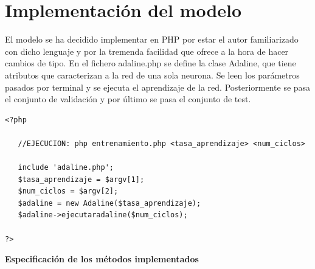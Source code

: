 \documentclass[11pt,spanish,listoffigures,listoftables]{tfgetsinf}
\begin{document}
\section{Implementación del modelo}

\par El modelo se ha decidido implementar en PHP por estar el autor familiarizado con dicho lenguaje y por la tremenda facilidad que ofrece a la hora de hacer cambios de tipo. En el fichero adaline.php se define la clase Adaline, que tiene atributos que caracterizan a la red de una sola neurona. Se leen los parámetros pasados por terminal y se ejecuta el aprendizaje de la red. Posteriormente se pasa el conjunto de validación y por último se pasa el conjunto de test.

\begin{lstlisting}
<?php

   //EJECUCION: php entrenamiento.php <tasa_aprendizaje> <num_ciclos>

   include 'adaline.php';
   $tasa_aprendizaje = $argv[1];
   $num_ciclos = $argv[2];
   $adaline = new Adaline($tasa_aprendizaje);
   $adaline->ejecutaradaline($num_ciclos);

?>
\end{lstlisting}

\par \textbf{Especificación de los métodos implementados}
\end{document}
